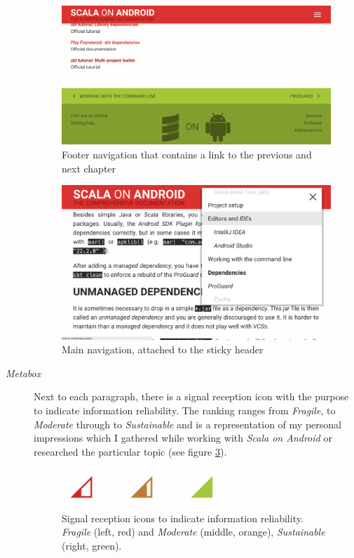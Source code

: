 \begin{description}
	\begin{figure}[]
		\includegraphics[width=\textwidth]{asset/story-telling.png}
		\caption{Footer navigation that contains a link to the previous and next chapter}
		\label{story-telling}
	\end{figure}

	\begin{figure}[]
		\includegraphics[width=\textwidth]{asset/navigation.png}
		\caption{Main navigation, attached to the sticky header}
		\label{navigation}
	\end{figure}

	\item[\textit{Metabox}]\hfill

	Next to each paragraph, there is a signal reception icon with the purpose to indicate information reliability. The ranking ranges from \textit{Fragile}, to \textit{Moderate} through to \textit{Sustainable} and is a representation of my personal impressions which I gathered while working with \textit{Scala on Android} or researched the particular topic (see figure \ref{reception-icons}).

	\begin{figure}[]
		\center
		\includegraphics[width=6cm]{asset/reception-icons.png}
		\caption{Signal reception icons to indicate information reliability. \textit{Fragile} (left, red) and \textit{Moderate} (middle, orange), \textit{Sustainable} (right, green).}
		\label{reception-icons}
	\end{figure}


\end{description}
